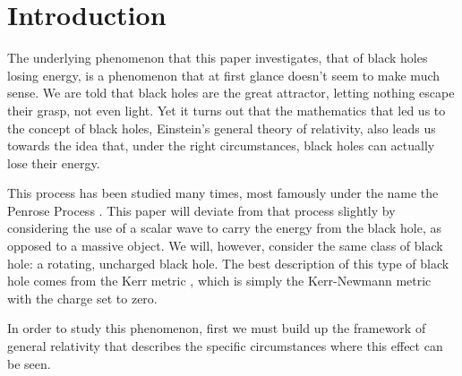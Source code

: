 \documentclass[11pt]{article}
\numberwithin{equation}{section}
\numberwithin{figure}{section}
\numberwithin{table}{section}
\begin{document}
\section{Introduction}\label{sec:Introduction}
\par The underlying phenomenon that this paper investigates, that of black holes losing energy, is a phenomenon that at first glance doesn't seem to make much sense. We are told that black holes are the great attractor, letting nothing escape their grasp, not even light. Yet it turns out that the mathematics that led us to the concept of black holes, Einstein's general theory of relativity, also leads us towards the idea that, under the right circumstances, black holes can actually lose their energy. 
\par This process has been studied many times, most famously under the name the Penrose Process \cite{Penrose}. This paper will deviate from that process slightly by considering the use of a scalar wave to carry the energy from the black hole, as opposed to a massive object. We will, however, consider the same class of black hole: a rotating, uncharged black hole. The best description of this type of black hole comes from the Kerr metric \cite{kerr}, which is simply the Kerr-Newmann metric with the charge set to zero. 
\par In order to study this phenomenon, first we must build up the framework of general relativity that describes the specific circumstances where this effect can be seen. 
\end{document}
